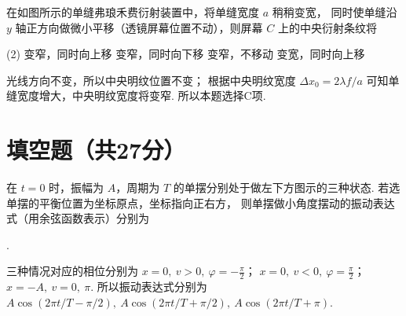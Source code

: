 \begin{textfig}
  \begin{problem}
    在如图所示的单缝弗琅禾费衍射装置中，将单缝宽度 $a$ 稍稍变宽，
    同时使单缝沿 $y$ 轴正方向做微小平移（透镜屏幕位置不动），则屏幕 $C$ 上的中央衍射条纹将
    \begin{tasks}(2)
      \task 变窄，同时向上移
      \task 变窄，同时向下移
      \task[\true] 变窄，不移动
      \task 变宽，同时向上移
    \end{tasks}
  \end{problem}
  \textfigsplit\centering
\end{textfig}
\begin{solution}
  光线方向不变，所以中央明纹位置不变；
  根据中央明纹宽度 $\Delta x_0 = 2\lambda f/a$ 可知单缝宽度增大，中央明纹宽度将变窄.
  所以本题选择C项.
\end{solution}

\section{填空题（共27分）}

\begin{problem}[本题3分]
  在 $t = 0$ 时，振幅为 $A$，周期为 $T$ 的单摆分别处于做左下方图示的三种状态.
  若选单摆的平衡位置为坐标原点，坐标指向正右方，
  则单摆做小角度摆动的振动表达式（用余弦函数表示）分别为
  \begin{enumerate*}[ label = (\alph*) ]
    \item {}
    \item {}
    \item {}.
  \end{enumerate*}
\end{problem}
\begin{solution}
  三种情况对应的相位分别为 $x = 0,~ v > 0,~ \varphi = -\frac\pi2$；
  $x = 0,~ v < 0,~ \varphi = \frac\pi2$；$x = -A,~ v = 0,~ \pi$.
  所以振动表达式分别为
  $A\cos(2\pi t/T - \pi/2),~ A\cos(2\pi t/T + \pi/2),~ A\cos(2\pi t/T + \pi)$.
\end{solution}

